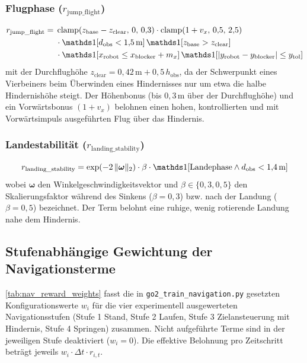\subsubsection{Flugphase ($r_{\text{jump\_flight}}$)}
\begin{equation}\label{eq:nav_jump_flight}
\begin{aligned}
r_{\text{jump\_flight}} ={}& \operatorname{clamp}\!\left(z_{\text{base}} - z_{\text{clear}},\,0,\,0{,}3\right)\cdot\operatorname{clamp}\!\left(1+v_x,\,0{,}5,\,2{,}5\right) \\
& \cdot\ind[d_{\text{obs}}<1{,}5\,\text{m}]\, \ind[z_{\text{base}}>z_{\text{clear}}] \\
& \cdot \ind[x_{\text{robot}}\le x_{\text{blocker}}+m_x]\, \ind[|y_{\text{robot}}-y_{\text{blocker}}|\le y_{\text{tol}}]
\end{aligned}
\end{equation}
mit der Durchflughöhe $z_{\text{clear}} = 0{,}42\,\text{m} + 0{,}5\,h_{\text{obs}}$, da der Schwerpunkt eines Vierbeiners beim Überwinden eines Hindernisses nur um etwa die halbe Hindernishöhe steigt. Der Höhenbonus (bis $0{,}3\,\text{m}$ über der Durchflughöhe) und ein Vorwärtsbonus $(1+v_x)$ belohnen einen hohen, kontrollierten und mit Vorwärtsimpuls ausgeführten Flug über das Hindernis.

\subsubsection{Landestabilität ($r_{\text{landing\_stability}}$)}
\begin{equation}\label{eq:nav_landing_stability}
r_{\text{landing\_stability}} = \exp\!\left(-2\,\lVert \boldsymbol{\omega}\rVert_2\right)\cdot \beta \cdot \ind[\text{Landephase}\wedge d_{\text{obs}}<1{,}4\,\text{m}]
\end{equation}
wobei $\boldsymbol{\omega}$ den Winkelgeschwindigkeitsvektor und $\beta\in\{0{,}3,0{,}5\}$ den Skalierungsfaktor während des Sinkens ($\beta=0{,}3$) bzw. nach der Landung ($\beta=0{,}5$) bezeichnet. Der Term belohnt eine ruhige, wenig rotierende Landung nahe dem Hindernis.

\subsection{Stufenabhängige Gewichtung der Navigationsterme}

\autoref{tab:nav_reward_weights} fasst die in \texttt{go2\_train\_navigation.py} gesetzten Konfigurationswerte $w_i$ für die vier experimentell ausgewerteten Navigationsstufen (Stufe 1 Stand, Stufe 2 Laufen, Stufe 3 Zielansteuerung mit Hindernis, Stufe 4 Springen) zusammen. Nicht aufgeführte Terme sind in der jeweiligen Stufe deaktiviert ($w_i = 0$). Die effektive Belohnung pro Zeitschritt beträgt jeweils $w_i\cdot\Delta t\cdot r_{i,t}$.

